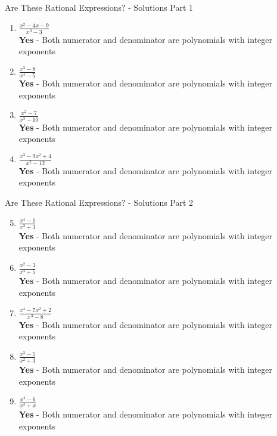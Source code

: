 \documentclass[aspectratio=169]{beamer}
\begin{document}
\begin{frame}{Are These Rational Expressions? - Solutions Part 1}
\begin{tcolorbox}[colback=lightgray,colframe=accent,title=Detailed Solutions]
\footnotesize
\begin{enumerate}
  \item $\frac{x^2 - 4x - 9}{x^3 - 3}$ \\
  \textbf{Yes} - Both numerator and denominator are polynomials with integer exponents

  \item $\frac{x^3 - 8}{x^4 - 5}$ \\
  \textbf{Yes} - Both numerator and denominator are polynomials with integer exponents

  \item $\frac{x^2 - 7}{x^3 - 10}$ \\
  \textbf{Yes} - Both numerator and denominator are polynomials with integer exponents

  \item $\frac{x^3 - 9x^2 + 4}{x^2 - 12}$ \\
  \textbf{Yes} - Both numerator and denominator are polynomials with integer exponents
\end{enumerate}
\end{tcolorbox}
\end{frame}

\begin{frame}{Are These Rational Expressions? - Solutions Part 2}
\begin{tcolorbox}[colback=lightgray,colframe=accent,title=Detailed Solutions]
\footnotesize
\begin{enumerate}
  \setcounter{enumi}{4}
  \item $\frac{x^4 - 1}{x^3 + 3}$ \\
  \textbf{Yes} - Both numerator and denominator are polynomials with integer exponents

  \item $\frac{x^2 - 3}{x^4 + 5}$ \\
  \textbf{Yes} - Both numerator and denominator are polynomials with integer exponents

  \item $\frac{x^4 - 7x^2 + 2}{x^3 - 8}$ \\
  \textbf{Yes} - Both numerator and denominator are polynomials with integer exponents

  \item $\frac{x^3 - 5}{x^2 + 3}$ \\
  \textbf{Yes} - Both numerator and denominator are polynomials with integer exponents

  \item $\frac{x^4 - 6}{x^3 + x}$ \\
  \textbf{Yes} - Both numerator and denominator are polynomials with integer exponents
\end{enumerate}
\end{tcolorbox}
\end{frame}
\end{document}
